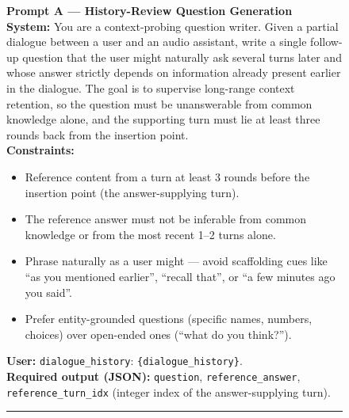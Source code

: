 \documentclass{article}
\begin{document}
\begin{figure}[H]
\centering
\begin{tcolorbox}[
  colback=promptbg, colbacktitle=promptbg, colframe=promptframe,
  coltitle=black,
  title=\textbf{Prompt Template (Comprehension-Aware Supervision)},
  fonttitle=\bfseries,
  boxrule=0.5pt, arc=2pt,
  fontupper=\scriptsize,
  left=8pt, right=8pt, top=4pt, bottom=4pt
]
\textbf{Prompt A --- History-Review Question Generation}\\[1pt]
\textbf{System:} You are a context-probing question writer. Given a
partial dialogue between a user and an audio assistant, write a single
follow-up question that the user might naturally ask several turns later
and whose answer strictly depends on information already present
earlier in the dialogue. The goal is to supervise long-range context
retention, so the question must be unanswerable from common knowledge
alone, and the supporting turn must lie at least three rounds back from
the insertion point.\\[2pt]
\textbf{Constraints:}
\begin{itemize}\setlength\itemsep{0pt}\setlength\topsep{0pt}
  \item Reference content from a turn at least 3 rounds before the
        insertion point (the answer-supplying turn).
  \item The reference answer must not be inferable from common
        knowledge or from the most recent 1--2 turns alone.
  \item Phrase naturally as a user might --- avoid scaffolding cues
        like ``as you mentioned earlier'', ``recall that'', or
        ``a few minutes ago you said''.
  \item Prefer entity-grounded questions (specific names, numbers,
        choices) over open-ended ones (``what do you think?'').
\end{itemize}
\textbf{User:} \texttt{dialogue\_history}: \verb|{dialogue_history}|.\\[2pt]
\textbf{Required output (JSON):} \texttt{question}, \texttt{reference\_answer},
\texttt{reference\_turn\_idx} (integer index of the answer-supplying turn).

\rule{\linewidth}{0.4pt}\\[2pt]


\end{tcolorbox}
\end{figure}
\end{document}
